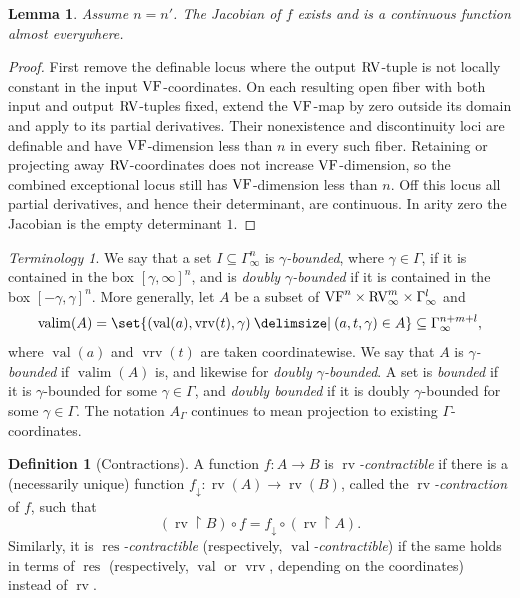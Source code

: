 \documentclass[12pt]{amsart}
\newcommand{\memph}[1]{{\color{magenta}\emph{#1}}}
\theoremstyle{plain}
\newtheorem{lem}[thm]{Lemma}
\theoremstyle{definition}
\newtheorem{defn}[thm]{Definition}
\theoremstyle{remark}
\newtheorem{ter}[thm]{Terminology}
\numberwithin{equation}{section}
\theoremstyle{plain}
\newcommand{\VF}{\textup{VF}}
\newcommand{\RV}{\textup{RV}}
\DeclareMathOperator{\res}{res}  %
\newcommand{\0}{\emptyset}
\newcommand{\rest}{\upharpoonright}
\newcommand{\fun}{\longrightarrow}
\newcommand{\sub}{\subseteq}
\providecommand\given{}
\newcommand\SetSymbol[1][]{%
\nonscript \: #1 \vert
\allowbreak
\nonscript\:
\mathopen{}}
\renewcommand\given{\SetSymbol[\delimsize]}
\DeclareMathOperator{\rv}{rv}
\DeclareMathOperator{\vv}{val}
\DeclareMathOperator{\vrv}{vrv}
\begin{document}
\begin{lem}\label{diff:almost:every}
Assume $n=n'$. The Jacobian of $f$ exists and is a continuous function almost everywhere.
\end{lem}
\begin{proof}
First remove the definable locus where the output $\RV$-tuple is not locally constant in the input $\VF$-coordinates. On each resulting open fiber with both input and output $\RV$-tuples fixed, extend the $\VF$-map by zero outside its domain and apply \cite[Corollary~9.9]{Yin:special:trans} to its partial derivatives. Their nonexistence and discontinuity loci are definable and have $\VF$-dimension less than $n$ in every such fiber. Retaining or projecting away $\RV$-coordinates does not increase $\VF$-dimension, so the combined exceptional locus still has $\VF$-dimension less than $n$. Off this locus all partial derivatives, and hence their determinant, are continuous. In arity zero the Jacobian is the empty determinant $1$.
\end{proof}


\begin{ter}\label{bounded}
We say that a set $I \sub \Gamma_{\infty}^n$ is \memph{$\gamma$-bounded}, where $\gamma \in \Gamma$, if it is contained in the box $[\gamma, \infty]^n$, and is \memph{doubly $\gamma$-bounded} if it is contained in the box $[-\gamma, \gamma]^n$. More generally, let $A$ be a subset of $\VF^n \times \RV_\infty^m \times \Gamma_\infty^l$ and
\[
\operatorname{valim}(A) = \set{(\vv(a), \vrv(t), \gamma) \given (a, t, \gamma) \in A} \sub \Gamma_{\infty}^{n+m+l},
\]
where $\vv(a)$ and $\vrv(t)$ are taken coordinatewise. We say that $A$ is \memph{$\gamma$-bounded} if $\operatorname{valim}(A)$ is, and likewise for \memph{doubly $\gamma$-bounded}. A set is \memph{bounded} if it is $\gamma$-bounded for some $\gamma\in\Gamma$, and \memph{doubly bounded} if it is doubly $\gamma$-bounded for some $\gamma\in\Gamma$. The notation $A_{\Gamma}$ continues to mean projection to existing $\Gamma$-coordinates.
\end{ter}


\begin{defn}[Contractions]\label{defn:corr:cont}
A function $f : A \fun B$ is \memph{$\rv$-contractible} if there is a (necessarily unique) function $f_{\downarrow} : \rv(A) \fun \rv(B)$, called the \memph{$\rv$-contraction} of $f$, such that
\[
(\rv \rest B) \circ f = f_{\downarrow} \circ (\rv \rest A).
\]
Similarly, it is \memph{$\res$-contractible} (respectively, \memph{$\vv$-contractible}) if the same holds in terms of $\res$ (respectively, $\vv$ or $\vrv$, depending on the coordinates) instead of $\rv$.
\end{defn}
\end{document}

